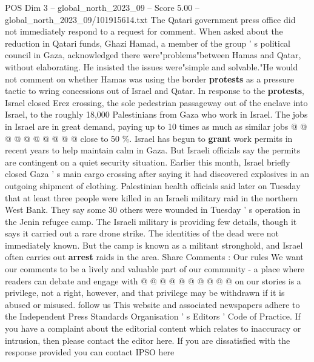 \begin{textsample}{POS Dim 3 – global\_north\_2023\_09 – Score 5.00 – global\_north\_2023\_09/101915614.txt}
The Qatari government press office did not immediately respond to a request for comment.
When asked about the reduction in Qatari funds, Ghazi Hamad, a member of the group ' s political council in Gaza, acknowledged there were"problems"between Hamas and Qatar, without elaborating.
He insisted the issues were"simple and solvable."He would not comment on whether Hamas was using the border \textbf{protests} as a pressure tactic to wring concessions out of Israel and Qatar.
In response to the \textbf{protests}, Israel closed Erez crossing, the sole pedestrian passageway out of the enclave into Israel, to the roughly 18,000 Palestinians from Gaza who work in Israel.
The jobs in Israel are in great demand, paying up to 10 times as much as similar jobs @ @ @ @ @ @ @ @ @ @ close to 50 \%.
Israel has begun to \textbf{grant} work permits in recent years to help maintain calm in Gaza.
But Israeli officials say the permits are contingent on a quiet security situation.
Earlier this month, Israel briefly closed Gaza ' s main cargo crossing after saying it had discovered explosives in an outgoing shipment of clothing.
Palestinian health officials said later on Tuesday that at least three people were killed in an Israeli military raid in the northern West Bank.
They say some 30 others were wounded in Tuesday ' s operation in the Jenin refugee camp.
The Israeli military is providing few details, though it says it carried out a rare drone strike.
The identities of the dead were not immediately known.
But the camp is known as a militant stronghold, and Israel often carries out \textbf{arrest} raids in the area.
Share Comments : Our rules We want our comments to be a lively and valuable part of our community - a place where readers can debate and engage with @ @ @ @ @ @ @ @ @ @ on our stories is a privilege, not a right, however, and that privilege may be withdrawn if it is abused or misused. follow us This website and associated newspapers adhere to the Independent Press Standards Organisation ' s Editors ' Code of Practice.
If you have a complaint about the editorial content which relates to inaccuracy or intrusion, then please contact the editor here.
If you are dissatisfied with the response provided you can contact IPSO here

\end{textsample}
